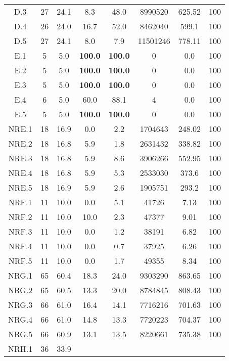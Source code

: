 \begin{longtable}{@{\extracolsep{5pt}}cccccccc}
	D.3 &
		27 & 24.1 &
			8.3
		&
			48.0
		& 8990520 & 625.52 & 100
	\\
	D.4 &
		26 & 24.0 &
			16.7
		&
			52.0
		& 8462040 & 599.1 & 100
	\\
	D.5 &
		27 & 24.1 &
			8.0
		&
			7.9
		& 11501246 & 778.11 & 100
	\\
	E.1 &
		5 & 5.0 &
			\textbf{100.0}
		&
			\textbf{100.0}
		& 0 & 0.0 & 100
	\\
	E.2 &
		5 & 5.0 &
			\textbf{100.0}
		&
			\textbf{100.0}
		& 0 & 0.0 & 100
	\\
	E.3 &
		5 & 5.0 &
			\textbf{100.0}
		&
			\textbf{100.0}
		& 0 & 0.0 & 100
	\\
	E.4 &
		6 & 5.0 &
			60.0
		&
			88.1
		& 4 & 0.0 & 100
	\\
	E.5 &
		5 & 5.0 &
			\textbf{100.0}
		&
			\textbf{100.0}
		& 0 & 0.0 & 100
	\\
	NRE.1 &
		18 & 16.9 &
			0.0
		&
			2.2
		& 1704643 & 248.02 & 100
	\\
	NRE.2 &
		18 & 16.8 &
			5.9
		&
			1.8
		& 2631432 & 338.82 & 100
	\\
	NRE.3 &
		18 & 16.8 &
			5.9
		&
			8.6
		& 3906266 & 552.95 & 100
	\\
	NRE.4 &
		18 & 16.8 &
			5.9
		&
			5.3
		& 2533030 & 373.6 & 100
	\\
	NRE.5 &
		18 & 16.9 &
			5.9
		&
			2.6
		& 1905751 & 293.2 & 100
	\\
	NRF.1 &
		11 & 10.0 &
			0.0
		&
			5.1
		& 41726 & 7.13 & 100
	\\
	NRF.2 &
		11 & 10.0 &
			10.0
		&
			2.3
		& 47377 & 9.01 & 100
	\\
	NRF.3 &
		11 & 10.0 &
			0.0
		&
			1.2
		& 38191 & 6.82 & 100
	\\
	NRF.4 &
		11 & 10.0 &
			0.0
		&
			0.7
		& 37925 & 6.26 & 100
	\\
	NRF.5 &
		11 & 10.0 &
			0.0
		&
			1.7
		& 49355 & 8.34 & 100
	\\
	NRG.1 &
		65 & 60.4 &
			18.3
		&
			24.0
		& 9303290 & 863.65 & 100
	\\
	NRG.2 &
		65 & 60.5 &
			13.3
		&
			20.0
		& 8784845 & 808.43 & 100
	\\
	NRG.3 &
		66 & 61.0 &
			16.4
		&
			14.1
		& 7716216 & 701.63 & 100
	\\
	NRG.4 &
		66 & 61.0 &
			14.8
		&
			13.3
		& 7720223 & 704.37 & 100
	\\
	NRG.5 &
		66 & 60.9 &
			13.1
		&
			13.5
		& 8220661 & 735.38 & 100
	\\
	NRH.1 &
		36 & 33.9 &

\end{longtable}
